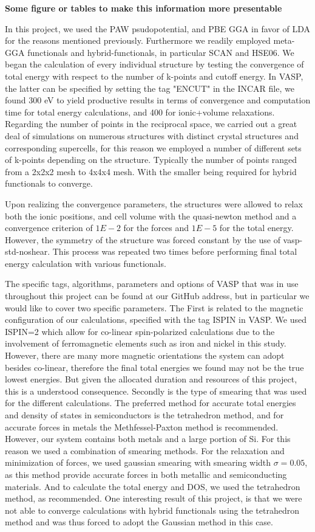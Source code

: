 \textbf{Some figure or tables to make this information more presentable}

In this project, we used the PAW psudopotential, and PBE GGA in favor of LDA for the reasons mentioned previously. Furthermore we readily employed meta-GGA functionals and hybrid-functionals, in particular SCAN and HSE06. We began the calculation of every individual structure by testing the convergence of total energy with respect to the number of k-points and cutoff energy. In VASP, the latter can be specified by setting the tag "ENCUT" in the INCAR file, we found 300 eV to yield productive results in terms of convergence and computation time for total energy calculations, and 400 for ionic+volume relaxations. Regarding the number of points in the reciprocal space, we carried out a great deal of simulations on numerous structures with distinct crystal structures and corresponding supercells, for this reason we employed a number of different sets of k-points depending on the structure. Typically the number of points ranged from a 2x2x2 mesh to 4x4x4 mesh. With the smaller being required for hybrid functionals to converge. 

Upon realizing the convergence parameters, the structures were allowed to relax both the ionic positions, and cell volume with the quasi-newton method and a convergence criterion of $1E-2$ for the forces and $1E-5$ for the total energy. However, the symmetry of the structure was forced constant by the use of vasp-std-noshear. This process was repeated two times before performing final total energy calculation with various functionals.

The specific tags, algorithms, parameters and options of VASP that was in use throughout this project can be found at our GitHub address, but in particular we would like to cover two specific parameters. The First is related to the magnetic configuration of our calculations, specified with the tag ISPIN in VASP. We used ISPIN=2 which allow for co-linear spin-polarized calculations due to the involvement of ferromagnetic elements such as iron and nickel in this study. However, there are many more magnetic orientations the system can adopt besides co-linear, therefore the final total energies we found may not be the true lowest energies. But given the allocated duration and resources of this project, this is a understood consequence. Secondly is the type of smearing that was used for the different calculations. The preferred method for accurate total energies and density of states in semiconductors is the tetrahedron method, and for accurate forces in metals the Methfessel-Paxton method is recommended. However, our system contains both metals and a large portion of Si. For this reason we used a combination of smearing methods. For the relaxation and minimization of forces, we used gaussian smearing with smearing width $\sigma = 0.05$, as this method provide accurate forces in both metallic and semiconducting materials. And to calculate the total energy and DOS, we used the tetrahedron method, as recommended. One interesting result of this project, is that we were not able to converge calculations with hybrid functionals using the tetrahedron method and was thus forced to adopt the Gaussian method in this case.

